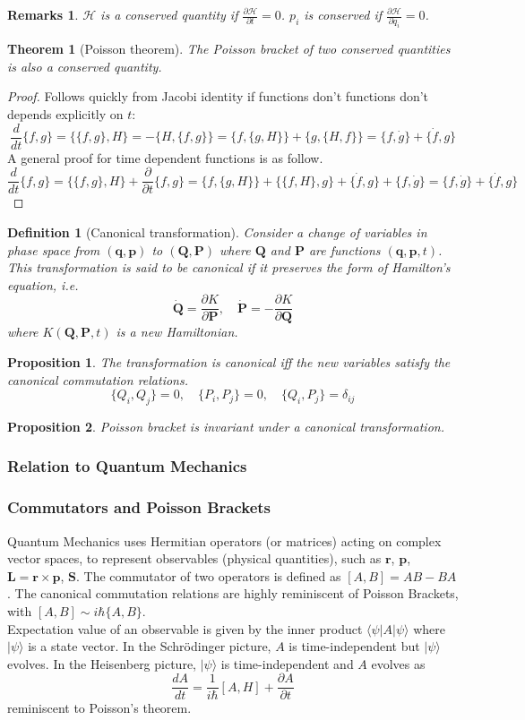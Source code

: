 \documentclass[a4paper]{article}
\newtheorem{defi}{Definition}[section]
\newtheorem{remarks}{Remarks}[section]
\newtheorem{thm}{Theorem}[section]
\newtheorem{prop}{Proposition}[section]
\theoremstyle{new}
\begin{document}
\begin{remarks}
$\mathcal{H}$ is a conserved quantity if $\frac{\partial\mathcal{H}}{\partial t}=0$. $p_i$ is conserved if $\frac{\partial\mathcal{H}}{\partial q_i}=0$.
\end{remarks}
\begin{thm}[Poisson theorem]
The Poisson bracket of two conserved quantities is also a conserved quantity.
\end{thm}
\begin{proof}
Follows quickly from Jacobi identity if functions don’t functions don’t depends explicitly on $t$:
$$\frac{d}{dt}\{f,g\}=\{\{f,g\},H\}=-\{H,\{f,g\}\}=\{f,\{g,H\}\}+\{g,\{H,f\}\}=\{f,\dot{g}\}+\{\dot{f},g\}$$
A general proof for time dependent functions is as follow.
$$\frac{d}{dt}\{f, g\} =\{\{f, g\}, H\} +\frac{\partial}{\partial t}\{f, g\}=\{f, \{g, H\}\} + \{\{f, H\}, g\} + \{\dot{f},g\}+\{f, \dot{g}\}=\{f,\dot{g}\}+\{\dot{f},g\}$$
\end{proof}
\begin{defi}[Canonical transformation]
Consider a change of variables in phase space from $(\mathbf{q},\mathbf{p})$ to $(\mathbf{Q},\mathbf{P})$ where $\mathbf{Q}$ and $\mathbf{P}$ are functions $(\mathbf{q},\mathbf{p}, t)$. This transformation is said to be canonical if it preserves the form of Hamilton’s equation, i.e.
$$\mathbf{\dot{Q}}=\frac{\partial K}{\partial\mathbf{P}},\quad\mathbf{\dot{P}}=-\frac{\partial K}{\partial\mathbf{Q}}$$
where $K(\mathbf{Q},\mathbf{P},t)$ is a new Hamiltonian.
\end{defi}
\begin{prop}
 The transformation is canonical iff the new variables satisfy the canonical commutation relations.
 $$\{Q_i,Q_j\}=0,\quad\{P_i,P_j\}=0,\quad\{Q_i,P_j\}=\delta_{ij}$$
\end{prop}
\begin{prop}
Poisson bracket is invariant under a canonical transformation.
\end{prop}
\subsubsection{Relation to Quantum Mechanics}
\subsubsection*{Commutators and Poisson Brackets}
Quantum Mechanics uses Hermitian operators (or matrices) acting on complex vector spaces, to represent observables (physical quantities), such as $\mathbf{r}$, $\mathbf{p}$, $\mathbf{L}=\mathbf{r}\times\mathbf{p}$, $\mathbf{S}$. The commutator of two operators is defined as $[A,B]=AB-BA$. The canonical commutation relations are highly reminiscent of Poisson Brackets, with $[A,B]\sim i\hbar\{A,B\}$.\\[5pt] 
Expectation value of an observable is given by the inner product $\langle\psi|A|\psi\rangle$ where $|\psi\rangle$ is a state vector. In the Schr\"{o}dinger picture, $A$ is time-independent but $|\psi\rangle$ evolves. In the Heisenberg picture, $|\psi\rangle$ is time-independent and $A$ evolves as
$$\frac{dA}{dt}=\frac{1}{i\hbar}[A,H]+\frac{\partial A}{\partial t}$$
reminiscent to Poisson's theorem.
\end{document}
